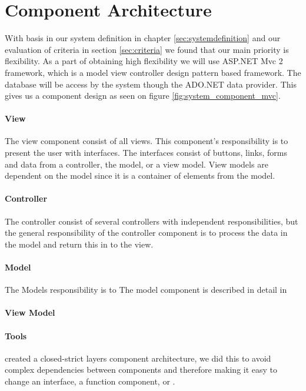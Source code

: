\section{Component Architecture}
\label{sec:components}
With basis in our system definition in chapter \ref{sec:systemdefinition} and our evaluation of criteria in section \ref{sec:criteria} we found that our main priority is flexibility. 
As a part of obtaining high flexibility we will use ASP.NET Mvc 2 framework, which is a model view controller design pattern based framework.
The database will be access by the system though the ADO.NET data provider. This gives us a component design as seen on figure \ref{fig:system_component_mvc}. 

\paragraph{View}
The view component consist of all views. 
This component's responsibility is to present the user with interfaces. 
The interfaces consist of buttons, links, forms and data from a controller, the model, or a view model. View models are dependent on the model since it is a container of elements from the model. 

\paragraph{Controller}
The controller consist of several controllers with independent responsibilities, but the general responsibility of the controller component is to process the data in the model and return this in to the view. 

\paragraph{Model}
The Models responsibility is to 
The model component is described in detail in 

\paragraph{View Model}

\paragraph{Tools}


created a closed-strict layers component architecture, we did this to avoid complex dependencies between components and therefore making it easy to change an interface, a function component, or . 



